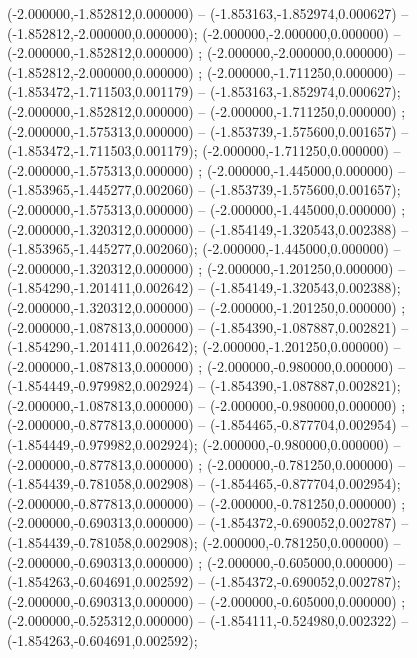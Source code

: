  (-2.000000,-1.852812,0.000000) -- (-1.853163,-1.852974,0.000627) -- (-1.852812,-2.000000,0.000000);
 (-2.000000,-2.000000,0.000000) -- (-2.000000,-1.852812,0.000000) ;
 (-2.000000,-2.000000,0.000000) -- (-1.852812,-2.000000,0.000000) ;
 (-2.000000,-1.711250,0.000000) -- (-1.853472,-1.711503,0.001179) -- (-1.853163,-1.852974,0.000627);
 (-2.000000,-1.852812,0.000000) -- (-2.000000,-1.711250,0.000000) ;
 (-2.000000,-1.575313,0.000000) -- (-1.853739,-1.575600,0.001657) -- (-1.853472,-1.711503,0.001179);
 (-2.000000,-1.711250,0.000000) -- (-2.000000,-1.575313,0.000000) ;
 (-2.000000,-1.445000,0.000000) -- (-1.853965,-1.445277,0.002060) -- (-1.853739,-1.575600,0.001657);
 (-2.000000,-1.575313,0.000000) -- (-2.000000,-1.445000,0.000000) ;
 (-2.000000,-1.320312,0.000000) -- (-1.854149,-1.320543,0.002388) -- (-1.853965,-1.445277,0.002060);
 (-2.000000,-1.445000,0.000000) -- (-2.000000,-1.320312,0.000000) ;
 (-2.000000,-1.201250,0.000000) -- (-1.854290,-1.201411,0.002642) -- (-1.854149,-1.320543,0.002388);
 (-2.000000,-1.320312,0.000000) -- (-2.000000,-1.201250,0.000000) ;
 (-2.000000,-1.087813,0.000000) -- (-1.854390,-1.087887,0.002821) -- (-1.854290,-1.201411,0.002642);
 (-2.000000,-1.201250,0.000000) -- (-2.000000,-1.087813,0.000000) ;
 (-2.000000,-0.980000,0.000000) -- (-1.854449,-0.979982,0.002924) -- (-1.854390,-1.087887,0.002821);
 (-2.000000,-1.087813,0.000000) -- (-2.000000,-0.980000,0.000000) ;
 (-2.000000,-0.877813,0.000000) -- (-1.854465,-0.877704,0.002954) -- (-1.854449,-0.979982,0.002924);
 (-2.000000,-0.980000,0.000000) -- (-2.000000,-0.877813,0.000000) ;
 (-2.000000,-0.781250,0.000000) -- (-1.854439,-0.781058,0.002908) -- (-1.854465,-0.877704,0.002954);
 (-2.000000,-0.877813,0.000000) -- (-2.000000,-0.781250,0.000000) ;
 (-2.000000,-0.690313,0.000000) -- (-1.854372,-0.690052,0.002787) -- (-1.854439,-0.781058,0.002908);
 (-2.000000,-0.781250,0.000000) -- (-2.000000,-0.690313,0.000000) ;
 (-2.000000,-0.605000,0.000000) -- (-1.854263,-0.604691,0.002592) -- (-1.854372,-0.690052,0.002787);
 (-2.000000,-0.690313,0.000000) -- (-2.000000,-0.605000,0.000000) ;
 (-2.000000,-0.525312,0.000000) -- (-1.854111,-0.524980,0.002322) -- (-1.854263,-0.604691,0.002592);
